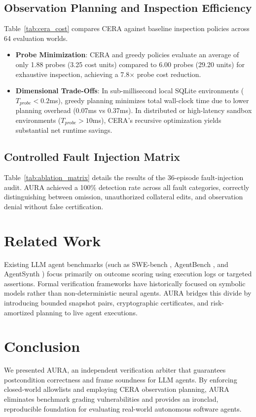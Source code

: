 \documentclass[11pt,a4paper]{article}
\newcommand{\aura}{\textsc{AURA}}
\newcommand{\cera}{\textsc{CERA}}
\begin{document}
\subsection{Observation Planning and Inspection Efficiency}
Table~\ref{tab:cera_cost} compares \cera{} against baseline inspection policies across 64 evaluation worlds.
\begin{itemize}
    \item \textbf{Probe Minimization}: \cera{} and greedy policies evaluate an average of only 1.88 probes (3.25 cost units) compared to 6.00 probes (29.20 units) for exhaustive inspection, achieving a 7.8$\times$ probe cost reduction.
    \item \textbf{Dimensional Trade-Offs}: In sub-millisecond local SQLite environments ($T_{probe} < 0.2$ms), greedy planning minimizes total wall-clock time due to lower planning overhead (0.07ms vs 0.37ms). In distributed or high-latency sandbox environments ($T_{probe} > 10$ms), \cera{}'s recursive optimization yields substantial net runtime savings.
\end{itemize}



\subsection{Controlled Fault Injection Matrix}
Table~\ref{tab:ablation_matrix} details the results of the 36-episode fault-injection audit. \aura{} achieved a 100\% detection rate across all fault categories, correctly distinguishing between omission, unauthorized collateral edits, and observation denial without false certification.

\section{Related Work}
Existing LLM agent benchmarks (such as SWE-bench \cite{jimenez2023swebench}, AgentBench \cite{liu2023agentbench}, and AgentSynth \cite{wang2024agentsynth}) focus primarily on outcome scoring using execution logs or targeted assertions. Formal verification frameworks \cite{clarke2000counterexample, reiter1991solution} have historically focused on symbolic models rather than non-deterministic neural agents. \aura{} bridges this divide by introducing bounded snapshot pairs, cryptographic certificates, and risk-amortized planning to live agent executions.

\section{Conclusion}
We presented \aura{}, an independent verification arbiter that guarantees postcondition correctness and frame soundness for LLM agents. By enforcing closed-world allowlists and employing \cera{} observation planning, \aura{} eliminates benchmark grading vulnerabilities and provides an ironclad, reproducible foundation for evaluating real-world autonomous software agents.



\end{document}
